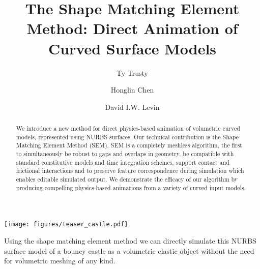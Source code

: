 \documentclass[acmtog, anonymous=false,review=false, nonacm, balance = false]{acmart}
\begin{document}
\title{The Shape Matching Element Method: Direct Animation of Curved Surface Models}

\author{Ty Trusty}
%
\author{Honglin Chen}
%
%
\author{David I.W. Levin}



\begin{teaserfigure}
  \texttt{[image: figures/teaser\_castle.pdf]}
  \caption{Using the shape matching element method we can directly simulate this NURBS surface model of a bouncy castle as a volumetric elastic object without the need for volumetric meshing of any kind.}
  \label{fig:teaser}
\end{teaserfigure}

\begin{abstract}
We introduce a new method for direct physics-based animation of volumetric curved models, represented using NURBS surfaces.  
Our technical contribution is the Shape Matching Element Method (SEM).
SEM is a completely meshless algorithm, the first to simultaneously 
be robust to gaps and overlaps in geometry, 
be compatible with standard constitutive models and time integration schemes, support contact and frictional interactions  
and to preserve feature correspondence during simulation which enables editable simulated output. 
We demonstrate the efficacy of our algorithm by producing compelling physics-based animations from a variety of curved input models.
\end{abstract}

\maketitle










\end{document}
